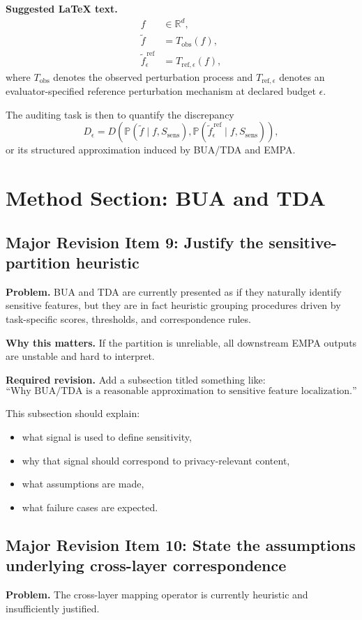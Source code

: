 \textbf{Suggested LaTeX text.}
\begin{align}
f &\in \mathbb{R}^{d}, \\
\tilde{f} &= T_{\mathrm{obs}}(f), \\
\tilde{f}^{\,\mathrm{ref}}_{\epsilon} &= T_{\mathrm{ref},\epsilon}(f),
\end{align}
where $T_{\mathrm{obs}}$ denotes the observed perturbation process and $T_{\mathrm{ref},\epsilon}$ denotes an evaluator-specified reference perturbation mechanism at declared budget $\epsilon$.

The auditing task is then to quantify the discrepancy
\[
D_\epsilon
=
D\!\left(
\mathbb{P}(\tilde{f}\mid f,S_{\mathrm{sens}}),
\mathbb{P}(\tilde{f}^{\,\mathrm{ref}}_{\epsilon}\mid f,S_{\mathrm{sens}})
\right),
\]
or its structured approximation induced by BUA/TDA and EMPA.

\section{Method Section: BUA and TDA}

\subsection*{Major Revision Item 9: Justify the sensitive-partition heuristic}
\textbf{Problem.} BUA and TDA are currently presented as if they naturally identify sensitive features, but they are in fact heuristic grouping procedures driven by task-specific scores, thresholds, and correspondence rules.

\textbf{Why this matters.} If the partition is unreliable, all downstream EMPA outputs are unstable and hard to interpret.

\textbf{Required revision.}
Add a subsection titled something like:
\[
\text{``Why BUA/TDA is a reasonable approximation to sensitive feature localization.''}
\]

This subsection should explain:
\begin{itemize}
    \item what signal is used to define sensitivity,
    \item why that signal should correspond to privacy-relevant content,
    \item what assumptions are made,
    \item what failure cases are expected.
\end{itemize}

\subsection*{Major Revision Item 10: State the assumptions underlying cross-layer correspondence}
\textbf{Problem.} The cross-layer mapping operator is currently heuristic and insufficiently justified.


